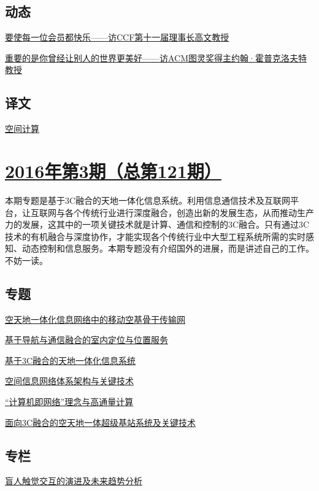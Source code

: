 \documentclass[a4paper]{article}
\begin{document}
\subsection{动态}
\href{http://history.ccf.org.cn/resources/1190201776262/2016/04/11/高文专访.pdf}{要使每一位会员都快乐——访CCF第十一届理事长高文教授}

\href{http://history.ccf.org.cn/resources/1190201776262/2016/04/11/老外专访.pdf}{重要的是你曾经让别人的世界更美好——访ACM图灵奖得主约翰·霍普克洛夫特教授}

\subsection{译文}
\href{http://history.ccf.org.cn/resources/1190201776262/2016/04/11/译文-.pdf}{空间计算}


\section{\href{http://history.ccf.org.cn/sites/ccf/jsjtbbd.jsp?contentId=2914672406466}{\textbf{2016年第3期（总第121期）}}}
本期专题是基于3C融合的天地一体化信息系统。利用信息通信技术及互联网平台，让互联网与各个传统行业进行深度融合，创造出新的发展生态，从而推动生产力的发展，这其中的一项关键技术就是计算、通信和控制的3C融合。只有通过3C技术的有机融合与深度协作，才能实现各个传统行业中大型工程系统所需的实时感知、动态控制和信息服务。本期专题没有介绍国外的进展，而是讲述自己的工作。不妨一读。
\subsection{专题}
\href{http://history.ccf.org.cn/resources/1190201776262/2016/03/14/5.pdf}{空天地一体化信息网络中的移动空基骨干传输网}

\href{http://history.ccf.org.cn/resources/1190201776262/2016/03/14/6.pdf}{基于导航与通信融合的室内定位与位置服务}

\href{http://history.ccf.org.cn/resources/1190201776262/2016/03/14/1.pdf}{基于3C融合的天地一体化信息系统}

\href{http://history.ccf.org.cn/resources/1190201776262/2016/03/14/4.pdf}{空间信息网络体系架构与关键技术}

\href{http://history.ccf.org.cn/resources/1190201776262/2016/03/14/2.pdf}{“计算机即网络”理念与高通量计算}

\href{http://history.ccf.org.cn/resources/1190201776262/2016/03/14/3.pdf}{面向3C融合的空天地一体超级基站系统及关键技术}

\subsection{专栏}
\href{http://history.ccf.org.cn/resources/1190201776262/2016/03/14/9.pdf}{盲人触觉交互的演进及未来趋势分析}
\end{document}
